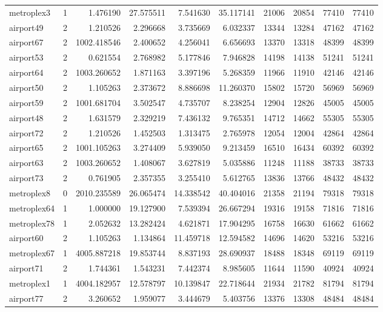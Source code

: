 \begin{longtable}{|l|r|r|r|r|r|r|r|r|r|}
metroplex3 & 1 & 1.476190 & 27.575511 & 7.541630 & 35.117141 & 21006 & 20854 & 77410 & 77410 \\
airport49 & 2 & 1.210526 & 2.296668 & 3.735669 & 6.032337 & 13344 & 13284 & 47162 & 47162 \\
airport67 & 2 & 1002.418546 & 2.400652 & 4.256041 & 6.656693 & 13370 & 13318 & 48399 & 48399 \\
airport53 & 2 & 0.621554 & 2.768982 & 5.177846 & 7.946828 & 14198 & 14138 & 51241 & 51241 \\
airport64 & 2 & 1003.260652 & 1.871163 & 3.397196 & 5.268359 & 11966 & 11910 & 42146 & 42146 \\
airport50 & 2 & 1.105263 & 2.373672 & 8.886698 & 11.260370 & 15802 & 15720 & 56969 & 56969 \\
airport59 & 2 & 1001.681704 & 3.502547 & 4.735707 & 8.238254 & 12904 & 12826 & 45005 & 45005 \\
airport48 & 2 & 1.631579 & 2.329219 & 7.436132 & 9.765351 & 14712 & 14662 & 55305 & 55305 \\
airport72 & 2 & 1.210526 & 1.452503 & 1.313475 & 2.765978 & 12054 & 12004 & 42864 & 42864 \\
airport65 & 2 & 1001.105263 & 3.274409 & 5.939050 & 9.213459 & 16510 & 16434 & 60392 & 60392 \\
airport63 & 2 & 1003.260652 & 1.408067 & 3.627819 & 5.035886 & 11248 & 11188 & 38733 & 38733 \\
airport73 & 2 & 0.761905 & 2.357355 & 3.255410 & 5.612765 & 13836 & 13766 & 48432 & 48432 \\
metroplex8 & 0 & 2010.235589 & 26.065474 & 14.338542 & 40.404016 & 21358 & 21194 & 79318 & 79318 \\
metroplex64 & 1 & 1.000000 & 19.127900 & 7.539394 & 26.667294 & 19316 & 19158 & 71816 & 71816 \\
metroplex78 & 1 & 2.052632 & 13.282424 & 4.621871 & 17.904295 & 16758 & 16630 & 61662 & 61662 \\
airport60 & 2 & 1.105263 & 1.134864 & 11.459718 & 12.594582 & 14696 & 14620 & 53216 & 53216 \\
metroplex67 & 1 & 4005.887218 & 19.853744 & 8.837193 & 28.690937 & 18488 & 18348 & 69119 & 69119 \\
airport71 & 2 & 1.744361 & 1.543231 & 7.442374 & 8.985605 & 11644 & 11590 & 40924 & 40924 \\
metroplex1 & 1 & 4004.182957 & 12.578797 & 10.139847 & 22.718644 & 21934 & 21782 & 81794 & 81794 \\
airport77 & 2 & 3.260652 & 1.959077 & 3.444679 & 5.403756 & 13376 & 13308 & 48484 & 48484 \\

\end{longtable}
